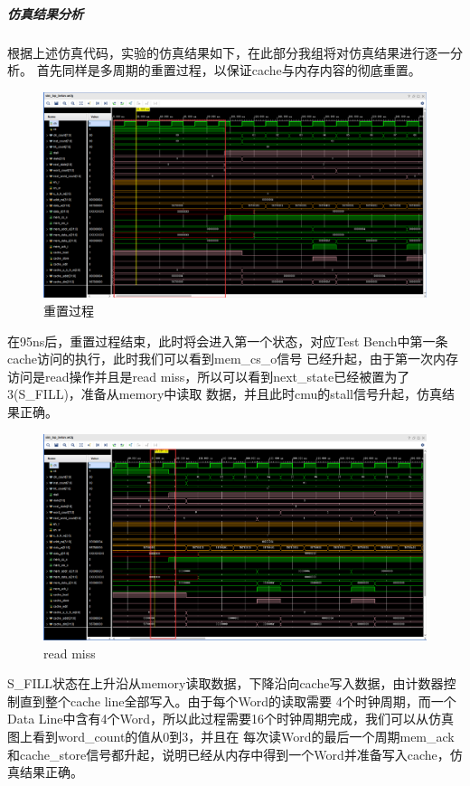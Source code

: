 \subparagraph{仿真结果分析}
根据上述仿真代码，实验的仿真结果如下，在此部分我组将对仿真结果进行逐一分析。
首先同样是多周期的重置过程，以保证cache与内存内容的彻底重置。
\begin{figure}[H] %
	\centering %
	\includegraphics[width=1.0\textwidth]{figs/sres1.png} %
	\caption{重置过程} %
	\label{Fig.4} %
\end{figure}

在95ns后，重置过程结束，此时将会进入第一个状态，对应Test Bench中第一条cache访问的执行，此时我们可以看到mem\_cs\_o信号
已经升起，由于第一次内存访问是read操作并且是read miss，所以可以看到next\_state已经被置为了3(S\_FILL)，准备从memory中读取
数据，并且此时cmu的stall信号升起，仿真结果正确。

\begin{figure}[H]
    \centering
    \includegraphics[width=1.0\textwidth]{figs/sres2.png}
    \caption{read miss}
    \label{Fig.5}
\end{figure}

S\_FILL状态在上升沿从memory读取数据，下降沿向cache写入数据，由计数器控制直到整个cache line全部写入。由于每个Word的读取需要
4个时钟周期，而一个Data Line中含有4个Word，所以此过程需要16个时钟周期完成，我们可以从仿真图上看到word\_count的值从0到3，并且在
每次读Word的最后一个周期mem\_ack和cache\_store信号都升起，说明已经从内存中得到一个Word并准备写入cache，仿真结果正确。

